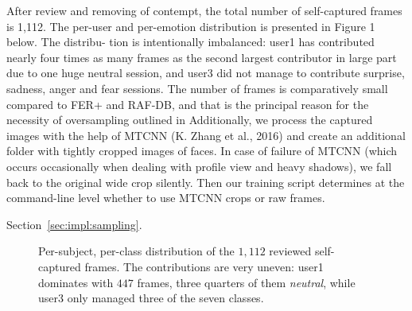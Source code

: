 \documentclass[12pt,a4paper]{article}
\begin{document}
After review and removing of contempt, the total number of self-captured frames is 1,112. The per-user and per-emotion distribution is presented in Figure 1 below. The distribu-
tion is intentionally imbalanced: user1 has contributed nearly four times as many frames as
the second largest contributor in large part due to one huge neutral session, and user3 did
not manage to contribute surprise, sadness, anger and fear sessions. The number of frames
is comparatively small compared to FER+ and RAF-DB, and that is the principal reason for
the necessity of oversampling outlined in Additionally, we process the captured images with the help of MTCNN (K. Zhang et al., 2016) and create an additional folder with tightly cropped images of faces. In case of failure of MTCNN (which occurs occasionally when dealing with profile view and heavy shadows), we fall back to the original wide crop silently. Then our training script determines at the command-line level whether to use MTCNN crops or raw frames.

Section~\ref{sec:impl:sampling}.

\begin{figure}[H]
  \centering
  \caption{\footnotesize Per-subject, per-class distribution of the
  $1{,}112$ reviewed self-captured frames. The contributions are
  very uneven: user1 dominates with $447$ frames, three quarters
  of them \emph{neutral}, while user3 only managed three of the
  seven classes.}
  \label{fig:selfdist}
\end{figure}
\end{document}
